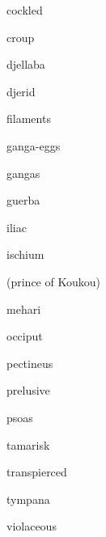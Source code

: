 
cockled

croup

djellaba

djerid

filaments

ganga-eggs

gangas

guerba

iliac

ischium

(prince of Koukou)

mehari

occiput

pectineus

prelusive

psoas

tamarisk

transpierced

tympana

violaceous